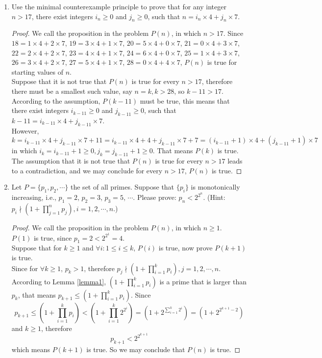 \documentclass[12pt,a4paper,UTF8]{article}
\theoremstyle{definition}
\begin{document}
\begin{enumerate}
    \item
    Use the minimal counterexample principle to prove that for any integer $n>17$, there exist integers $i_n\ge 0$ and $j_n\ge 0$, such that $n = i_n \times 4 + j_n \times 7$.
    \begin{proof}
        We call the proposition in the problem $ P(n) $, in which $ n > 17 $. Since $ 18 = 1 \times 4 + 2 \times 7 $, $ 19 = 3 \times 4 + 1 \times 7 $, $ 20 = 5 \times 4 + 0 \times 7 $, $ 21 = 0 \times 4 + 3 \times 7 $, $ 22 = 2 \times 4 + 2 \times 7 $, $ 23 = 4 \times 4 + 1 \times 7 $, $ 24 = 6 \times 4 + 0 \times 7 $, $ 25 = 1 \times 4 + 3 \times 7 $, $ 26 = 3 \times 4 + 2 \times 7 $, $ 27 = 5 \times 4 + 1 \times 7 $, $ 28 = 0 \times 4 + 4 \times 7 $, $ P(n) $ is true for starting values of $ n $.\\
        Suppose that it is not true that $ P(n) $ is true for every $ n > 17 $, therefore there must be a smallest such value, say $ n = k, k > 28 $, so $ k-11>17 $. According to the assumption, $ P(k - 11) $ must be true, this means that there exist integers $i_{k - 11} \ge 0$ and $j_{k-11} \ge 0$, such that $k-11 = i_{k - 11} \times 4 + j_{k - 11} \times 7$.\\
        However, $$ k = i_{k - 11} \times 4 + j_{k - 11} \times 7 + 11 = i_{k - 11} \times 4 + 4 + j_{k - 11} \times 7 + 7 = (i_{k - 11} + 1) \times 4 + (j_{k - 11} + 1) \times 7 $$ in which $ i_k = i_{k-11} + 1 \geq 0, j_k = j_{k-11} + 1 \geq 0 $. That means $ P(k) $ is true. The assumption that it is not true that $ P(n) $ is true for every $ n > 17 $ leads to a contradiction, and we may conclude for every $ n > 17 $, $ P(n) $ is true.
    \end{proof}

    \item
    Let $P=\{p_1, p_2, \cdots\}$ the set of all primes. Suppose that $\{p_i\}$ is monotonically    increasing, i.e., $p_1=2$, $p_2=3$, $p_3=5$, $\cdots$. Please prove: $p_n<2^{2^n}$. {\color{blue}(Hint: $p_i \nmid (1+\prod_{j=1}^n p_j), i=1,2,\cdots,n$.)}
    \begin{proof}
        We call the proposition in the problem $ P(n) $, in which $ n \geq 1 $.\\
        $ P(1) $ is true, since $ p_1 = 2 < 2^{2^1} = 4 $.\\
        Suppose that for  $ k \geq 1 $ and $ {\forall}i: 1 \leq i \leq k $, $ P(i) $ is true, now prove $ P(k+1) $ is true.\\
        Since for $ {\forall} k \geq 1 $, $ p_k>1 $, therefore $p_j \nmid (1+\prod_{i=1}^k p_i), j=1,2,\cdots,n $. According to Lemma \ref{lemma1}, $ (1+\prod_{i=1}^k p_i) $ is a prime that is larger than $ p_k $, that means $ p_{k+1} \leq (1+\prod_{i=1}^k p_i) $. Since
        $$ p_{k+1} \leq (1+\prod_{i=1}^k p_i) < (1+\prod_{i=1}^k 2^{2^i}) = (1+2^{\sum_{i=1}^k 2^i}) = (1+2^{2^{k+1}-2}) $$
        and $ k \geq 1 $, therefore 
        $$ p_{k+1} < 2^{2^{k+1}} $$
        which means $ P(k+1) $ is true.
        So we may conclude that $ P(n) $ is true.
    \end{proof}


\end{enumerate}
\end{document}
